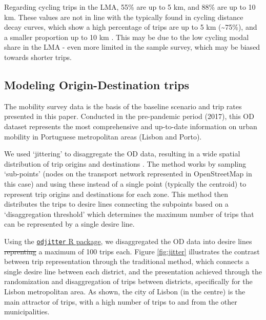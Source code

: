 \documentclass[review, doubleblind, 3p,
authoryear]{elsarticle} %
\providecommand{\DIFaddtex}[1]{{\protect\color{blue}\uwave{#1}}} %
\providecommand{\DIFdeltex}[1]{{\protect\color{red}\sout{#1}}}                      %
\providecommand{\DIFaddbegin}{} %
\providecommand{\DIFaddend}{} %
\providecommand{\DIFdelbegin}{} %
\providecommand{\DIFdelend}{} %
\providecommand{\DIFadd}[1]{\texorpdfstring{\DIFaddtex{#1}}{#1}} %
\providecommand{\DIFdel}[1]{\texorpdfstring{\DIFdeltex{#1}}{}} %
\newcommand{\DIFscaledelfig}{0.5}
\newlength{\DIFdelgraphicswidth} %
\newlength{\DIFdelgraphicsheight} %
\newcommand{\DIFaddincludegraphics}[2][]{{\color{blue}\fbox{\DIFOincludegraphics[#1]{#2}}}} %
\newcommand{\DIFdelincludegraphics}[2][]{%
\sbox{\DIFdelgraphicsbox}{\DIFOincludegraphics[#1]{#2}}%
\settoboxwidth{\DIFdelgraphicswidth}{\DIFdelgraphicsbox} %
\settoboxtotalheight{\DIFdelgraphicsheight}{\DIFdelgraphicsbox} %
\scalebox{\DIFscaledelfig}{%
\parbox[b]{\DIFdelgraphicswidth}{\usebox{\DIFdelgraphicsbox}\\[-\baselineskip] \rule{\DIFdelgraphicswidth}{0em}}\llap{\resizebox{\DIFdelgraphicswidth}{\DIFdelgraphicsheight}{%
\setlength{\unitlength}{\DIFdelgraphicswidth}%
\begin{picture}(1,1)%
\thicklines\linethickness{2pt} %
{\color[rgb]{1,0,0}\put(0,0){\framebox(1,1){}}}%
{\color[rgb]{1,0,0}\put(0,0){\line( 1,1){1}}}%
{\color[rgb]{1,0,0}\put(0,1){\line(1,-1){1}}}%
\end{picture}%
}\hspace*{3pt}}} %
} %
\DeclareRobustCommand{\DIFaddbegin}{\DIFOaddbegin \let\includegraphics\DIFaddincludegraphics} %
\DeclareRobustCommand{\DIFaddend}{\DIFOaddend \let\includegraphics\DIFOincludegraphics} %
\DeclareRobustCommand{\DIFdelbegin}{\DIFOdelbegin \let\includegraphics\DIFdelincludegraphics} %
\DeclareRobustCommand{\DIFdelend}{\DIFOaddend \let\includegraphics\DIFOincludegraphics} %
\begin{document}
Regarding cycling trips in the LMA, 55\% are up to 5 km, and 88\% are up
to 10 km. These values are not in line with the typically found in
cycling distance decay curves, which show a high percentage of trips are
up to 5 km (\textasciitilde75\%), and a smaller proportion up to 10 km
\citep{krizek2007detailed, larsen2010beyond, DDfunction2023}. This may
be due to the low cycling modal share in the LMA - even more limited in
the sample survey, which may be biased towards shorter trips.

\subsection{Modeling Origin-Destination
trips}\label{modeling-origin-destination-trips}

The mobility survey data \citep{IMOB} is the basis of the baseline
scenario and trip rates presented in this paper. Conducted in the
pre-pandemic period (2017), this OD dataset represents the most
comprehensive and up-to-date information on urban mobility in Portuguese
metropolitan areas (Lisbon and Porto).

We used `jittering' to disaggregate the OD data, resulting in a wide
spatial distribution of trip origins and destinations
\citep{Lovelace2022Jittering}. The method works by sampling `sub-points'
(nodes on the transport network represented in OpenStreetMap in this
case) and using these instead of a single point (typically the centroid)
to represent trip origins and destinations for each zone. This method
then distributes the trips to desire lines connecting the subpoints
based on a `disaggregation threshold' which determines the maximum
number of trips that can be represented by a single desire line.

Using the
\href{https://github.com/dabreegster/odjitter}{\texttt{odjitter} R
package}, we disaggregated the OD data into desire lines \DIFdelbegin \DIFdel{reprenting }\DIFdelend \DIFaddbegin \DIFadd{representing }\DIFaddend a
maximum of 100 trips each. Figure \ref{fig:jitter} illustrates the
contrast between trip representation through the traditional method,
which connects a single desire line between each district, and the
presentation achieved through the randomization and disaggregation of
trips between districts, specifically for the Lisbon metropolitan area.
As shown, the city of Lisbon (in the centre) is the main attractor of
trips, with a high number of trips to and from the other municipalities.
\end{document}

